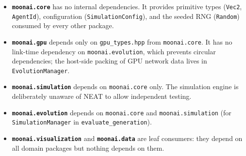 \begin{itemize}
  \item \textbf{\texttt{moonai.core}} has no internal dependencies.  It provides
    primitive types (\texttt{Vec2}, \texttt{AgentId}), configuration (\texttt{SimulationConfig}),
    and the seeded RNG (\texttt{Random}) consumed by every other package.
  \item \textbf{\texttt{moonai.gpu}} depends only on \texttt{gpu\_types.hpp} from
    \texttt{moonai.core}.  It has no link-time dependency on \texttt{moonai.evolution},
    which prevents circular dependencies; the host-side packing of GPU network data
    lives in \texttt{EvolutionManager}.
  \item \textbf{\texttt{moonai.simulation}} depends on \texttt{moonai.core} only.
    The simulation engine is deliberately unaware of NEAT to allow independent testing.
  \item \textbf{\texttt{moonai.evolution}} depends on \texttt{moonai.core} and
    \texttt{moonai.simulation} (for \texttt{SimulationManager} in
    \texttt{evaluate\_generation}).
  \item \textbf{\texttt{moonai.visualization}} and \textbf{\texttt{moonai.data}} are
    leaf consumers: they depend on all domain packages but nothing depends on them.
\end{itemize}
